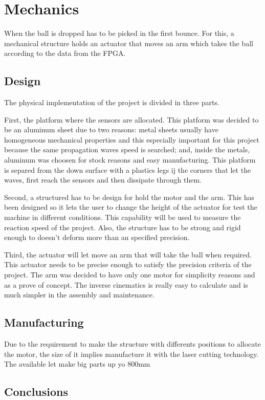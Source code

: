 \chapter{Mechanics} %
\label{cha:Mechanics}
	When the ball is dropped has to be picked in the first bounce. 
	For this, a mechanical structure holds an actuator that moves an arm which takes the ball according to the data from the FPGA.

	\section{Design} %
	\label{sec:design}
		The physical implementation of the project is divided in three parts.

		First, the platform where the sensors are allocated. 
		This platform was decided to be an aluminum sheet due to two reasons: metal sheets usually have homogeneous mechanical properties and this especially important for this project because the same propagation waves speed is searched; and, inside the metals, aluminum was choosen for stock reasons and easy manufacturing. 
		This platform is separed from the down surface with a plastics legs ij the corners that let the waves, first reach the sensors and then dissipate through them.

		Second, a structured has to be design for hold the motor and the arm. 
		This has been designed so it lets the user to change the height of the actuator for test the machine in different conditions. 
		This capability will be used to measure the reaction speed of the project. 
		Also, the structure has to be strong and rigid enough to doesn't deform more than an specified precision.

		Third, the actuator will let move an arm that will take the ball when required. 
		This actuator needs to be precise enough to satisfy the precision criteria of the project. 
		The arm was decided to have only one motor for simplicity reasons and as a prove of concept. 
		The inverse cinematics is really easy to calculate and is much simpler in the assembly and maintenance.
			

	\section{Manufacturing} %
	\label{sec:manufacturing}
		Due to the requirement to make the structure with differents positions to allocate the motor, the size of it implies manufacture it with the laser cutting technology. 
		The available let make big parts up yo 800mm 


	\section{Conclusions} %
	\label{sec:mec_conclusions}


